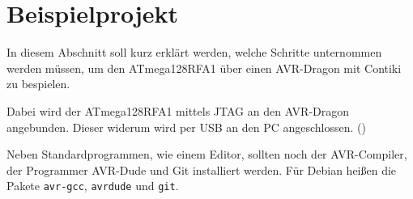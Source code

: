 \chapter{Beispielprojekt}
	In diesem Abschnitt soll kurz erklärt werden, welche Schritte
	unternommen werden müssen, um den ATmega128RFA1 über einen AVR-Dragon
	mit Contiki zu bespielen.

	Dabei wird der ATmega128RFA1 mittels JTAG an den AVR-Dragon angebunden.
	Dieser widerum wird per USB an den PC angeschlossen.
	()
	

	Neben Standardprogrammen, wie einem Editor, sollten noch der
	AVR-Compiler, der Programmer AVR-Dude und Git installiert werden.  Für
	Debian heißen die Pakete \lstinline=avr-gcc=, \lstinline=avrdude=
	und \lstinline=git=.

